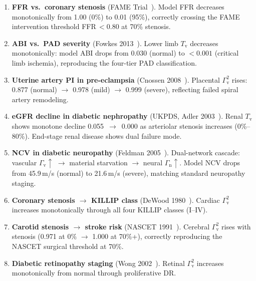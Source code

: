 ﻿\documentclass[aps,pre,twocolumn,superscriptaddress,floatfix]{revtex4-2}
\newcommand{\Gv}{\Gamma_{\mathrm{v}}}
\newcommand{\Gn}{\Gamma_{\mathrm{n}}}
\newcommand{\Tv}{T_{\mathrm{v}}}
\begin{document}
\begin{enumerate}
  \item[\textbf{C1.}] \textbf{FFR vs.\ coronary stenosis}
    (FAME Trial~\cite{DeBruyne2012}).
    Model FFR decreases monotonically from 1.00 (0\%) to
    0.01 (95\%), correctly crossing the FAME intervention
    threshold FFR\,$< 0.80$ at 70\% stenosis.

  \item[\textbf{C2.}] \textbf{ABI vs.\ PAD severity}
    (Fowkes 2013~\cite{Fowkes2013}).
    Lower limb $\Tv$ decreases monotonically: model ABI
    drops from 0.030 (normal) to $<0.001$ (critical limb
    ischemia), reproducing the four-tier PAD classification.

  \item[\textbf{C3.}] \textbf{Uterine artery PI in pre-eclampsia}
    (Cnossen 2008~\cite{Cnossen2008}).
    Placental $\Gv^2$ rises: 0.877 (normal) $\to$ 0.978
    (mild) $\to$ 0.999 (severe), reflecting failed spiral
    artery remodeling.

  \item[\textbf{C4.}] \textbf{eGFR decline in diabetic nephropathy}
    (UKPDS, Adler 2003~\cite{Adler2003}).
    Renal $\Tv$ shows monotone decline 0.055~$\to$~0.000
    as arteriolar stenosis increases (0\%--80\%).
    End-stage renal disease shows dual failure mode.

  \item[\textbf{C5.}] \textbf{NCV in diabetic neuropathy}
    (Feldman 2005~\cite{Feldman2005}).
    Dual-network cascade: vascular $\Gv\uparrow$
    $\to$ material starvation $\to$ neural $\Gn\uparrow$.
    Model NCV drops from 45.9\,m/s (normal) to 21.6\,m/s
    (severe), matching standard neuropathy staging.

  \item[\textbf{C6.}] \textbf{Coronary stenosis $\to$ KILLIP class}
    (DeWood 1980~\cite{DeWood1980}).
    Cardiac $\Gv^2$ increases monotonically through all
    four KILLIP classes (I--IV).

  \item[\textbf{C7.}] \textbf{Carotid stenosis $\to$ stroke risk}
    (NASCET 1991~\cite{NASCET1991}).
    Cerebral $\Gv^2$ rises with stenosis (0.971 at 0\%
    $\to$ 1.000 at 70\%+), correctly reproducing the
    NASCET surgical threshold at 70\%.

  \item[\textbf{C8.}] \textbf{Diabetic retinopathy staging}
    (Wong 2002~\cite{Wong2002retina}).
    Retinal $\Gv^2$ increases monotonically from
    normal through proliferative DR.


\end{enumerate}
\end{document}
